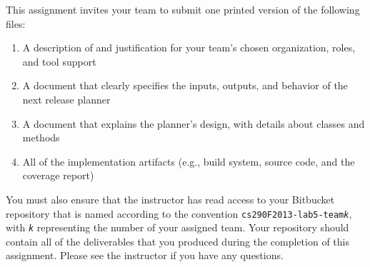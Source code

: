 This assignment invites your team to submit one printed version of the following files:
\vspace*{-.1in}
\begin{enumerate}
	\itemsep0em 
	\item A description of and justification for your team's chosen organization, roles, and tool support
	\item A document that clearly specifies the inputs, outputs, and behavior of the next release planner
	\item A document that explains the planner's design, with details about classes and methods
	\item All of the implementation artifacts (e.g., build system, source code, and the coverage report) 
\end{enumerate}
\vspace*{-.1in}

You must also ensure that the instructor has read access to your Bitbucket repository that is named according to the
convention {\tt cs290F2013-lab5-team{\em k}}, with {\tt {\em k}} representing the number of your assigned team.  Your
repository should contain all of the deliverables that you produced during the completion of this assignment.  Please
see the instructor if you have any questions.


